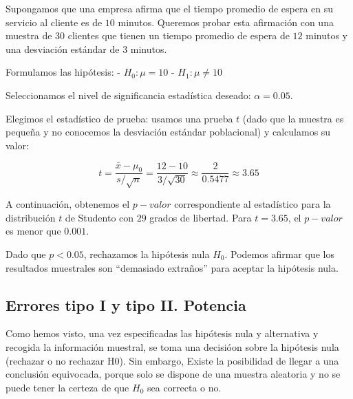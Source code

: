 \documentclass[
  letterpaper,
  DIV=11,
  numbers=noendperiod]{scrreprt}
\begin{document}
\begin{tcolorbox}[enhanced jigsaw, arc=.35mm, breakable, coltitle=black, left=2mm, opacityback=0, bottomtitle=1mm, colbacktitle=quarto-callout-tip-color!10!white, title=\textcolor{quarto-callout-tip-color}{\faLightbulb}\hspace{0.5em}{Ejemplo Práctico. Contraste de Hipótesis}, titlerule=0mm, colback=white, colframe=quarto-callout-tip-color-frame, bottomrule=.15mm, rightrule=.15mm, opacitybacktitle=0.6, toptitle=1mm, toprule=.15mm, leftrule=.75mm]

Supongamos que una empresa afirma que el tiempo promedio de espera en su
servicio al cliente es de \(10\) minutos. Queremos probar esta
afirmación con una muestra de \(30\) clientes que tienen un tiempo
promedio de espera de \(12\) minutos y una desviación estándar de \(3\)
minutos.

Formulamos las hipótesis: - \(H_0: \mu = 10\) - \(H_1: \mu \neq 10\)

Seleccionamos el nivel de significancia estadística deseado:
\(\alpha = 0.05\).

Elegimos el estadístico de prueba: usamos una prueba \(t\) (dado que la
muestra es pequeña y no conocemos la desviación estándar poblacional) y
calculamos su valor:

\[
   t = \frac{\bar{x} - \mu_0}{s / \sqrt{n}} = \frac{12 - 10}{3 / \sqrt{30}} \approx \frac{2}{0.5477} \approx 3.65
\]

A continuación, obtenemos el \(p-valor\) correspondiente al estadístico
para la distribución \(t\) de Studento con \(29\) grados de libertad.
Para \(t = 3.65\), el \(p-valor\) es menor que \(0.001\).

Dado que \(p < 0.05\), rechazamos la hipótesis nula \(H_0\). Podemos
afirmar que los resultados muestrales son ``demasiado extraños'' para
aceptar la hipótesis nula.

\end{tcolorbox}

\hypertarget{errores-tipo-i-y-tipo-ii.-potencia}{%
\subsection{Errores tipo I y tipo II.
Potencia}\label{errores-tipo-i-y-tipo-ii.-potencia}}

Como hemos visto, una vez especificadas las hipótesis nula y alternativa
y recogida la información muestral, se toma una decisióon sobre la
hipótesis nula (rechazar o no rechazar H0). Sin embargo, Existe la
posibilidad de llegar a una conclusión equivocada, porque solo se
dispone de una muestra aleatoria y no se puede tener la certeza de que
\(H_0\) sea correcta o no.
\end{document}
